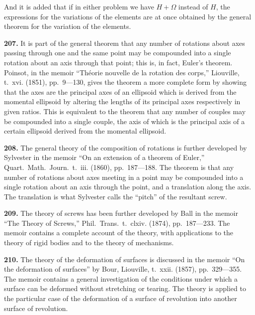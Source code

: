 \documentclass[11pt,a4paper]{book}
\begin{document}
And it is added that if in either problem we have $H + \Omega$ instead of $H$, the expressions for the variations of the elements are at once obtained by the general theorem for the variation of the elements.

\vspace{1em}

\noindent\textbf{207.} It is part of the general theorem that any number of rotations about axes passing through one and the same point may be compounded into a single rotation about an axis through that point; this is, in fact, Euler's theorem. Poinsot, in the memoir ``Th\'{e}orie nouvelle de la rotation des corps,'' Liouville, t.~xvi. (1851), pp.~9---130, gives the theorem a more complete form by showing that the axes are the principal axes of an ellipsoid which is derived from the momental ellipsoid by altering the lengths of its principal axes respectively in given ratios. This is equivalent to the theorem that any number of couples may be compounded into a single couple, the axis of which is the principal axis of a certain ellipsoid derived from the momental ellipsoid.

\vspace{1em}

\noindent\textbf{208.} The general theory of the composition of rotations is further developed by Sylvester in the memoir ``On an extension of a theorem of Euler,'' Quart.~Math.~Journ.~t.~iii. (1860), pp.~187---188. The theorem is that any number of rotations about axes meeting in a point may be compounded into a single rotation about an axis through the point, and a translation along the axis. The translation is what Sylvester calls the ``pitch'' of the resultant screw.

\vspace{1em}

\noindent\textbf{209.} The theory of screws has been further developed by Ball in the memoir ``The Theory of Screws,'' Phil.~Trans.~t.~clxiv. (1874), pp.~187---233. The memoir contains a complete account of the theory, with applications to the theory of rigid bodies and to the theory of mechanisms.

\vspace{1em}

\noindent\textbf{210.} The theory of the deformation of surfaces is discussed in the memoir ``On the deformation of surfaces'' by Bour, Liouville, t.~xxii. (1857), pp.~329---355. The memoir contains a general investigation of the conditions under which a surface can be deformed without stretching or tearing. The theory is applied to the particular case of the deformation of a surface of revolution into another surface of revolution.
\end{document}
